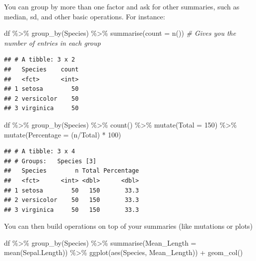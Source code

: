\documentclass[
]{book}
\newenvironment{Shaded}{\begin{snugshade}}{\end{snugshade}}
\newcommand{\AttributeTok}[1]{\textcolor[rgb]{0.77,0.63,0.00}{#1}}
\newcommand{\CommentTok}[1]{\textcolor[rgb]{0.56,0.35,0.01}{\textit{#1}}}
\newcommand{\DecValTok}[1]{\textcolor[rgb]{0.00,0.00,0.81}{#1}}
\newcommand{\FunctionTok}[1]{\textcolor[rgb]{0.00,0.00,0.00}{#1}}
\newcommand{\NormalTok}[1]{#1}
\newcommand{\SpecialCharTok}[1]{\textcolor[rgb]{0.00,0.00,0.00}{#1}}
\begin{document}
You can group by more than one factor and ask for other summaries, such as median, sd, and other basic operations.
For instance:

\begin{Shaded}
\begin{Highlighting}[]
\NormalTok{df }\SpecialCharTok{\%\textgreater{}\%} 
  \FunctionTok{group\_by}\NormalTok{(Species) }\SpecialCharTok{\%\textgreater{}\%} 
  \FunctionTok{summarise}\NormalTok{(}\AttributeTok{count =} \FunctionTok{n}\NormalTok{())  }\CommentTok{\# Gives you the number of entries in each group}
\end{Highlighting}
\end{Shaded}

\begin{verbatim}
## # A tibble: 3 x 2
##   Species    count
##   <fct>      <int>
## 1 setosa        50
## 2 versicolor    50
## 3 virginica     50
\end{verbatim}

\begin{Shaded}
\begin{Highlighting}[]
\NormalTok{df }\SpecialCharTok{\%\textgreater{}\%} 
  \FunctionTok{group\_by}\NormalTok{(Species) }\SpecialCharTok{\%\textgreater{}\%} 
  \FunctionTok{count}\NormalTok{() }\SpecialCharTok{\%\textgreater{}\%} 
  \FunctionTok{mutate}\NormalTok{(}\AttributeTok{Total =} \DecValTok{150}\NormalTok{) }\SpecialCharTok{\%\textgreater{}\%} 
  \FunctionTok{mutate}\NormalTok{(}\AttributeTok{Percentage =}\NormalTok{ (n}\SpecialCharTok{/}\NormalTok{Total) }\SpecialCharTok{*} \DecValTok{100}\NormalTok{)}
\end{Highlighting}
\end{Shaded}

\begin{verbatim}
## # A tibble: 3 x 4
## # Groups:   Species [3]
##   Species        n Total Percentage
##   <fct>      <int> <dbl>      <dbl>
## 1 setosa        50   150       33.3
## 2 versicolor    50   150       33.3
## 3 virginica     50   150       33.3
\end{verbatim}

You can then build operations on top of your summaries (like mutations or plots)

\begin{Shaded}
\begin{Highlighting}[]
\NormalTok{df }\SpecialCharTok{\%\textgreater{}\%} 
  \FunctionTok{group\_by}\NormalTok{(Species) }\SpecialCharTok{\%\textgreater{}\%} 
  \FunctionTok{summarise}\NormalTok{(}\AttributeTok{Mean\_Length =} \FunctionTok{mean}\NormalTok{(Sepal.Length)) }\SpecialCharTok{\%\textgreater{}\%} 
  \FunctionTok{ggplot}\NormalTok{(}\FunctionTok{aes}\NormalTok{(Species, Mean\_Length)) }\SpecialCharTok{+} 
  \FunctionTok{geom\_col}\NormalTok{()}
\end{Highlighting}
\end{Shaded}
\end{document}

